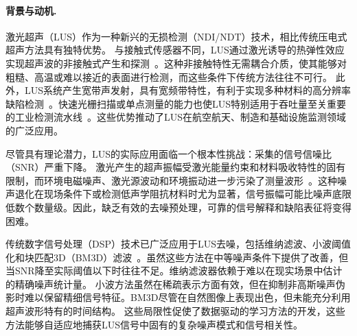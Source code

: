 \paragraph{背景与动机.}

激光超声（LUS）作为一种新兴的无损检测（NDI/NDT）技术，相比传统压电式超声方法具有独特优势。
与接触式传感器不同，LUS通过激光诱导的热弹性效应实现超声波的非接触式产生和探测~\cite{laser_us_ndt}。这种非接触特性无需耦合介质，使其能够对粗糙、高温或难以接近的表面进行检测，而这些条件下传统方法往往不可行。
此外，LUS系统产生宽带声发射，具有宽频带特性，有利于实现多种材料的高分辨率缺陷检测~\cite{laser_us_broadband}。快速光栅扫描或单点测量的能力也使LUS特别适用于吞吐量至关重要的工业检测流水线~\cite{laser_us_scanning}。这些优势推动了LUS在航空航天、制造和基础设施监测领域的广泛应用。

尽管具有理论潜力，LUS的实际应用面临一个根本性挑战：采集的信号信噪比（SNR）严重下降。
激光产生的超声振幅受激光能量约束和材料吸收特性的固有限制，而环境电磁噪声、激光源波动和环境振动进一步污染了测量波形~\cite{low_snr_challenge}。这种噪声退化在现场条件下或检测低声学阻抗材料时尤为显著，信号振幅可能比噪声底限低数个数量级。因此，缺乏有效的去噪预处理，可靠的信号解释和缺陷表征将变得困难。

传统数字信号处理（DSP）技术已广泛应用于LUS去噪，包括维纳滤波、小波阈值化和块匹配3D（BM3D）滤波~\cite{wiener_filter,wavelet_denoise,bm3d_denoise}。虽然这些方法在中等噪声条件下提供了改善，但当SNR降至实际阈值以下时往往不足。维纳滤波器依赖于难以在现实场景中估计的精确噪声统计量。
小波方法虽然在稀疏表示方面有效，但在抑制非高斯噪声伪影时难以保留精细信号特征。BM3D尽管在自然图像上表现出色，但未能充分利用超声波形特有的时间结构。
这些局限性促使了数据驱动的学习方法的开发，这些方法能够自适应地捕获LUS信号中固有的复杂噪声模式和信号相关性。